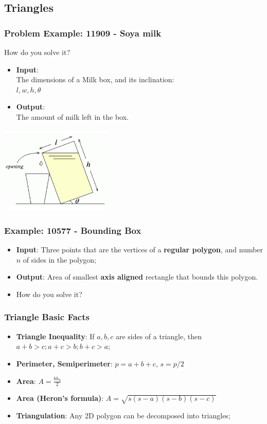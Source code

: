 \subsection{Triangles}

\begin{frame}
  \frametitle{Problem Example: 11909 - Soya milk}
  \begin{block}{How do you solve it?}
    \begin{itemize}
    \item {\bf Input}:\\
      The dimensions of a Milk box, and its inclination:\\
      $l, w, h, \theta$
    \item {\bf Output}:\\
      The amount of milk left in the box.
    \end{itemize}
  \end{block}

  \includegraphics[width=0.4\textwidth]{img/milk_uva}
\end{frame}

\begin{frame}[t]
  \frametitle{Example: 10577 - Bounding Box}
  \begin{block}{}
    \begin{itemize}
      \item {\bf Input}: Three points that are the vertices of a {\bf regular polygon}, and number $n$ of sides in the polygon;\medskip
      \item {\bf Output}: Area of smallest {\bf axis aligned} rectangle that bounds this polygon.\medskip
      \item How do you solve it?
    \end{itemize}
  \end{block}
\end{frame}

\begin{frame}
  \frametitle{Triangle Basic Facts}

    \begin{itemize}
    \item {\bf Triangle Inequality}: If $a,b,c$ are sides of a triangle, then $a+b > c; a+c > b; b+c > a$;\bigskip
    \item {\bf Perimeter, Semiperimeter}: $p = a+b+c$, $s = p/2$\bigskip
    \item {\bf Area}: $A = \frac{bh_b}{2}$\bigskip
    \item {\bf Area (Heron's formula)}: $A = \sqrt{s(s-a)(s-b)(s-c)}$\bigskip
    \item {\bf Triangulation}: Any 2D polygon can be decomposed into triangles;
  \end{itemize}
\end{frame}

